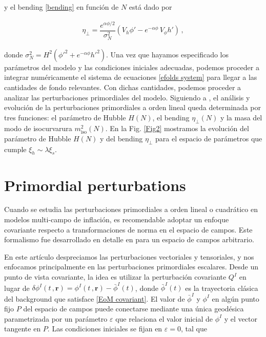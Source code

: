 \documentclass[12pt,a4paper,english,nofootinbib]{revtex4}
\newcommand{\beq}{\begin{eqnarray}}
\newcommand{\enq}{\end{eqnarray}}
\begin{document}
y el bending \eqref{bending} en función de $N$ está dado por 

\beq
    \eta_\perp = \dfrac{e^{\alpha\phi/2}}{\sigma_N^2}\left( V_h\phi' - e^{-\alpha\phi}\,V_\phi h' \right)\,,
    \label{bending efolds}
\enq


donde $\sigma_N^2 = H^2(\phi'^2 + e^{-\alpha\phi}h'^2)$.  Una vez que hayamos especificado los parámetros del modelo y las condiciones iniciales adecuadas, podemos proceder a integrar numéricamente el sistema de ecuaciones \eqref{efolds system} para llegar a las cantidades de fondo relevantes. Con dichas cantidades, podemos proceder a analizar las perturbaciones primordiales del modelo. 
Siguiendo a \cite{Fumagalli2021}, el análisis y evolución de la perturbaciones primordiales a orden lineal queda determinada por tres funciones: el parámetro de Hubble $H(N)$, el bending $\eta_\perp(N)$ y la masa del modo de isocurvarura $m_\text{iso}^2(N)$.
En la Fig. \ref{Fig2} mostramos la evolución del parámetro de Hubble $H(N)$ y del bending $\eta_\perp$ para el espacio de parámetros que cumple $\xi_h \sim \lambda\xi_s$. 









\section{Primordial perturbations
\label{perturbations}}

Cuando se estudia las perturbaciones primordiales a orden lineal o cuadrático en modelos multi-campo de inflación, es recomendable adoptar un enfoque covariante respecto a transformaciones de norma en el espacio de campos. Este formalismo fue desarrollado en detalle en \cite{Gong2011} para un espacio de campos arbitrario. 

En este artículo despreciamos las perturbaciones vectoriales y tensoriales, y nos enfocamos principalmente en las perturbaciones primordiales escalares. 
Desde un punto de vista covariante, la idea es utilizar la perturbación covariante $Q^I$ en lugar de $\delta\phi^I(t\,,\mathbf{r}) = \phi^I(t\,,\mathbf{r}) - \bar{\phi}^I(t)$, donde $\bar{\phi}^I(t)$ es la trayectoria clásica del background que satisface \eqref{EoM covariant}. El valor de $\bar{\phi}^I$ y $\phi^I$ en algún punto fijo $P$ del espacio de campos puede conectarse mediante una única geodésica parametrizada por un parámetro $\varepsilon$ que relaciona el valor inicial de $\phi^I$ y el vector tangente en $P$. Las condiciones iniciales se fijan en $\varepsilon = 0$, tal que
\end{document}
